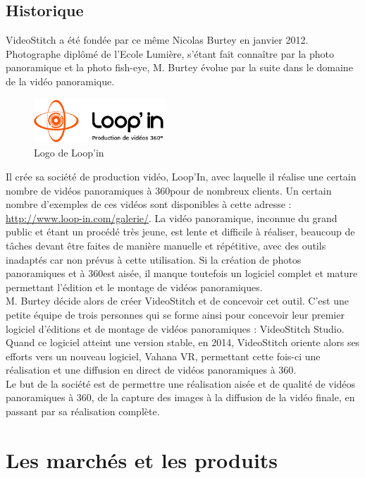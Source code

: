 \subsection{Historique}
VideoStitch a été fondée par ce même Nicolas Burtey en janvier 2012.\\
Photographe diplômé de l'Ecole Lumière, s'étant fait connaître par la photo panoramique et la photo fish-eye, M. Burtey évolue par la suite dans le domaine de la vidéo panoramique.\\
\begin{figure}
    \includegraphics[width=50mm]{images/loopin.png}
    \caption{Logo de Loop'in}
\end{figure}
Il crée sa société de production vidéo, Loop'In, avec laquelle il réalise une certain nombre de vidéos panoramiques à 360\degree pour de nombreux clients. Un certain nombre d'exemples de ces vidéos sont disponibles à cette adresse : \url{http://www.loop-in.com/galerie/}.
La vidéo panoramique, inconnue du grand public et étant un procédé très jeune, est lente et difficile à réaliser, beaucoup de tâches devant être faites de manière manuelle et répétitive, avec des outils inadaptés car non prévus à cette utilisation.
Si la création de photos panoramiques et à 360\degree est aisée, il manque toutefois un logiciel complet et mature permettant l'édition et le montage de vidéos panoramiques.\\
\newline
M. Burtey décide alors de créer VideoStitch et de concevoir cet outil. C'est une petite équipe de trois personnes qui se forme ainsi pour concevoir leur premier logiciel d'éditions et de montage de vidéos panoramiques : VideoStitch Studio.\\
Quand ce logiciel atteint une version stable, en 2014, VideoStitch oriente alors ses efforts vers un nouveau logiciel, Vahana VR, permettant cette fois-ci une réalisation et une diffusion en direct de vidéos panoramiques à 360\degree.\\
\newline
Le but de la société est de permettre une réalisation aisée et de qualité de vidéos panoramiques à 360\degree, de la capture des images à la diffusion de la vidéo finale, en passant par sa réalisation complète.


\section{Les marchés et les produits}

